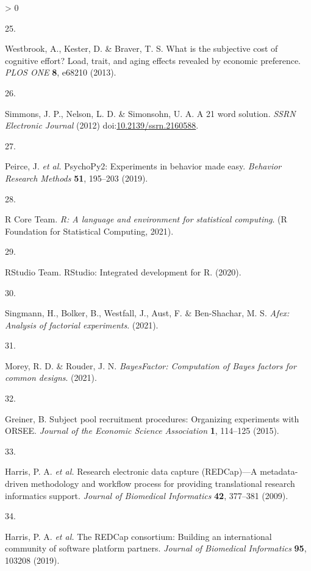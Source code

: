 \documentclass[
  english,
  man,floatsintext]{apa6}
\newlength{\cslhangindent}
\newlength{\csllabelwidth}
\newenvironment{CSLReferences}[2] %
 {%
  \setlength{\parindent}{0pt}
  \ifodd #1 \everypar{\setlength{\hangindent}{\cslhangindent}}\ignorespaces\fi
  \ifnum #2 > 0
  \setlength{\parskip}{#2\baselineskip}
  \fi
 }%
 {}
\newcommand{\CSLLeftMargin}[1]{\parbox[t]{\csllabelwidth}{#1}}
\newcommand{\CSLRightInline}[1]{\parbox[t]{\linewidth - \csllabelwidth}{#1}\break}
\begin{document}
\begin{CSLReferences}{0}{0}
\leavevmode\hypertarget{ref-Westbrook2013}{}%
\CSLLeftMargin{25. }
\CSLRightInline{Westbrook, A., Kester, D. \& Braver, T. S. What is the subjective cost of cognitive effort? {Load}, trait, and aging effects revealed by economic preference. \emph{PLOS ONE} \textbf{8}, e68210 (2013).}

\leavevmode\hypertarget{ref-Simmons2012}{}%
\CSLLeftMargin{26. }
\CSLRightInline{Simmons, J. P., Nelson, L. D. \& Simonsohn, U. A. A 21 word solution. \emph{SSRN Electronic Journal} (2012) doi:\href{https://doi.org/10.2139/ssrn.2160588}{10.2139/ssrn.2160588}.}

\leavevmode\hypertarget{ref-Peirce2019}{}%
\CSLLeftMargin{27. }
\CSLRightInline{Peirce, J. \emph{et al.} {PsychoPy2}: {Experiments} in behavior made easy. \emph{Behavior Research Methods} \textbf{51}, 195--203 (2019).}

\leavevmode\hypertarget{ref-RCore2021}{}%
\CSLLeftMargin{28. }
\CSLRightInline{R Core Team. \emph{R: A language and environment for statistical computing}. (R Foundation for Statistical Computing, 2021).}

\leavevmode\hypertarget{ref-RStudioTeam2020}{}%
\CSLLeftMargin{29. }
\CSLRightInline{RStudio Team. {RStudio}: {Integrated} development for {R}. (2020).}

\leavevmode\hypertarget{ref-Singmann2021}{}%
\CSLLeftMargin{30. }
\CSLRightInline{Singmann, H., Bolker, B., Westfall, J., Aust, F. \& Ben-Shachar, M. S. \emph{Afex: {A}nalysis of factorial experiments}. (2021).}

\leavevmode\hypertarget{ref-Morey2021}{}%
\CSLLeftMargin{31. }
\CSLRightInline{Morey, R. D. \& Rouder, J. N. \emph{{BayesFactor}: {Computation} of {Bayes} factors for common designs}. (2021).}

\leavevmode\hypertarget{ref-Greiner2015}{}%
\CSLLeftMargin{32. }
\CSLRightInline{Greiner, B. Subject pool recruitment procedures: {Organizing} experiments with {ORSEE}. \emph{Journal of the Economic Science Association} \textbf{1}, 114--125 (2015).}

\leavevmode\hypertarget{ref-Harris2009}{}%
\CSLLeftMargin{33. }
\CSLRightInline{Harris, P. A. \emph{et al.} Research electronic data capture ({REDCap})---{A} metadata-driven methodology and workflow process for providing translational research informatics support. \emph{Journal of Biomedical Informatics} \textbf{42}, 377--381 (2009).}

\leavevmode\hypertarget{ref-Harris2019}{}%
\CSLLeftMargin{34. }
\CSLRightInline{Harris, P. A. \emph{et al.} The {REDCap} consortium: {Building} an international community of software platform partners. \emph{Journal of Biomedical Informatics} \textbf{95}, 103208 (2019).}


\end{CSLReferences}
\end{document}
